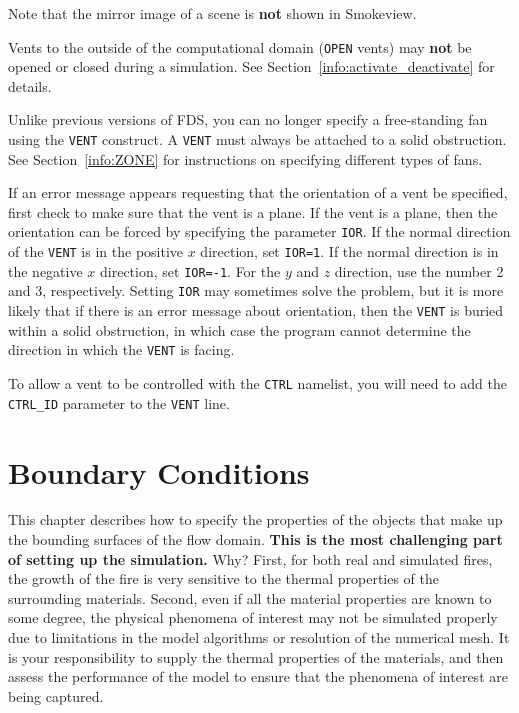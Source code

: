 \documentclass[11pt]{book}
\newcommand{\ct}{\tt\small}
\begin{document}
\begin{warning}
\noindent
Note that the mirror image of a scene is {\bf not} shown in Smokeview.
\end{warning}

\begin{warning}
Vents to the outside of the computational domain ({\ct OPEN} vents)
may {\bf not} be opened or closed during a simulation. See Section~\ref{info:activate_deactivate} for details.
\end{warning}

\begin{warning}
Unlike previous versions of FDS, you can no longer specify a free-standing fan using the {\ct VENT}
construct. A {\ct VENT} must always be attached to a solid obstruction. See
Section~\ref{info:ZONE} for instructions on specifying different types of fans.
\end{warning}


If an error message appears requesting that 
the orientation of a vent be specified, first check to make sure that the vent is a plane.
If the vent is a plane, then the orientation can be forced by specifying the parameter {\ct IOR}.
If the normal direction of the {\ct VENT} is in the positive $x$ direction, set {\ct IOR=1}.
If the normal direction is in the negative $x$ direction, set {\ct IOR=-1}. For the $y$ and
$z$ direction, use the number 2 and 3, respectively. Setting {\ct IOR} may sometimes solve
the problem, but it is more likely that if there is an error message about orientation, then
the {\ct VENT} is buried within a solid obstruction, in which case the program cannot determine
the direction in which the {\ct VENT} is facing.


To allow a vent to be controlled with the {\ct CTRL} namelist, you will need to add the {\ct CTRL\_ID} parameter to the {\ct VENT} line.



\chapter{Boundary Conditions}

This chapter describes how to specify the properties of the objects
that make up the bounding surfaces of the flow domain. {\bf This is
the most challenging part of setting up the simulation.} Why?  First,
for both real and simulated fires, the growth of the fire is very
sensitive to the thermal properties of the surrounding
materials. Second, even if all the material properties are known to
some degree, the physical phenomena of interest may not be simulated
properly due to limitations in the model algorithms or resolution of
the numerical mesh. It is your responsibility to supply the thermal
properties of the materials, and then assess the performance of the
model to ensure that the phenomena of interest are being captured.
\end{document}
